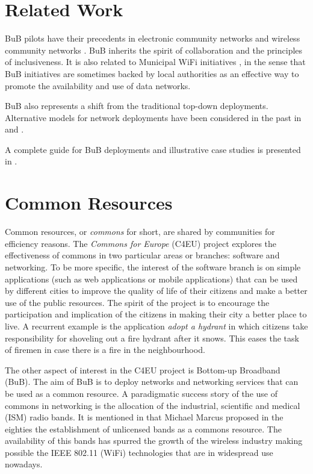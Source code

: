 \documentclass[conference]{IEEEtran}
\begin{document}
\section{Related Work}

BuB pilots have their precedents in electronic community networks \cite{schuler1994cnb} and wireless community networks \cite{flickenger2001wcn,jain2003wcn}.
BuB inherits the spirit of collaboration and the principles of inclusiveness.
It is also related to Municipal WiFi initiatives \cite{jassem2010mwc}, in the sense that BuB initiatives are sometimes backed by local authorities as an effective way to promote the availability and use of data networks.

BuB also represents a shift from the traditional top-down deployments.
Alternative models for network deployments have been considered in the past in \cite{barcelo2008wom} and \cite{seraghiti2010upw}.

A complete guide for BuB deployments and illustrative case studies is presented in \cite{aichele2006wnd}.

\section{Common Resources}
\label{sec:commons}
Common resources, or \emph{commons} for short, are shared by communities for efficiency reasons.
The \emph{Commons for Europe} (C4EU) project explores the effectiveness of commons in two particular areas or branches: software and networking.
To be more specific, the interest of the software branch is on simple applications (such as web applications or mobile applications) that can be used by different cities to improve the quality of life of their citizens and make a better use of the public resources.
The spirit of the project is to encourage the participation and implication of the citizens in making their city a better place to live.
A recurrent example is the application \emph{adopt a hydrant} in which citizens take responsibility for shoveling out a fire hydrant after it snows.
This eases the task of firemen in case there is a fire in the neighbourhood.

The other aspect of interest in the C4EU project is Bottom-up Broadband (BuB).
The aim of BuB is to deploy networks and networking services that can be used as a common resource.
A paradigmatic success story of the use of commons in networking is the allocation of the industrial, scientific and medical (ISM) radio bands.
It is mentioned in \cite{abramson2009asw} that Michael Marcus proposed in the eighties the establishment of unlicensed bands as a commons resource.
The availability of this bands has spurred the growth of the wireless industry making possible the IEEE 802.11 (WiFi) technologies that are in widespread use nowadays.
\end{document}
